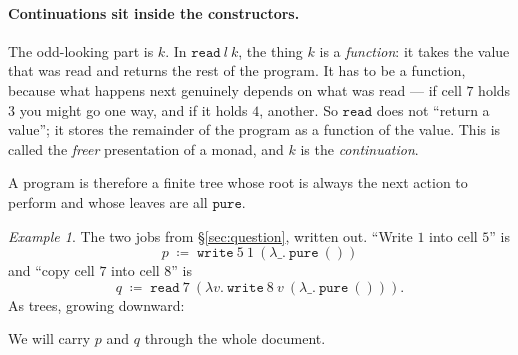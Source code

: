\documentclass[11pt,a4paper]{article}
\theoremstyle{definition}
\theoremstyle{plain}
\theoremstyle{remark}
\newtheorem{example}[definition]{Example}
\begin{document}
\paragraph{Continuations sit inside the constructors.}
The odd-looking part is $k$. In $\texttt{read}\ l\ k$, the thing $k$ is a \emph{function}:
it takes the value that was read and returns the rest of the program. It has to be a
function, because what happens next genuinely depends on what was read --- if cell $7$
holds $3$ you might go one way, and if it holds $4$, another. So $\texttt{read}$ does not
``return a value''; it stores the remainder of the program as a function of the value. This
is called the \emph{freer} presentation of a monad, and $k$ is the \emph{continuation}.

A program is therefore a finite tree whose root is always the next action to perform and
whose leaves are all $\texttt{pure}$.

\begin{example}\label{ex:twoprogs}
The two jobs from \S\ref{sec:question}, written out. ``Write $1$ into cell $5$'' is
\[
  p \;\coloneqq\; \texttt{write}\ 5\ 1\ (\lambda \_.\ \texttt{pure}\ ())
\]
and ``copy cell $7$ into cell $8$'' is
\[
  q \;\coloneqq\; \texttt{read}\ 7\ (\lambda v.\ \texttt{write}\ 8\ v\ (\lambda \_.\ \texttt{pure}\ ())) .
\]
As trees, growing downward:
\begin{center}
\end{center}
We will carry $p$ and $q$ through the whole document.
\end{example}
\end{document}
